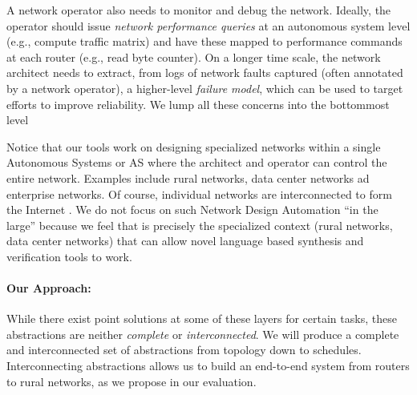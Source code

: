 A network operator also needs to
monitor and debug the network.  Ideally, the operator should issue
{\em network performance queries} at an autonomous system level (e.g.,
compute traffic matrix) and have these mapped to performance commands
at each router (e.g., read byte counter).  On a longer time scale, the
network architect needs to extract, from logs of network faults
captured (often annotated by a network operator), a higher-level
{\em failure model}, which can be used to target efforts to improve
reliability. We lump all these concerns into the bottommost level

Notice that our tools work on designing specialized networks within a single
Autonomous Systems or AS where the architect and operator can control the 
entire network.  Examples include rural networks, data center networks ad 
enterprise networks. Of course, individual networks are interconnected to form the Internet .  We do not focus on such Network Design Automation ``in the large''
because we feel that is precisely the specialized context (rural networks, 
data center networks) that can allow novel language based synthesis and
verification tools to work.

\paragraph*{Our Approach:} While there exist point solutions at some of
these layers for certain tasks, these abstractions are neither {\em
  complete} or {\em interconnected}. We will produce a complete and
interconnected set of abstractions from topology down to schedules.
Interconnecting abstractions allows us to build
an end-to-end system from routers to rural networks, as we propose
in our evaluation.



 
